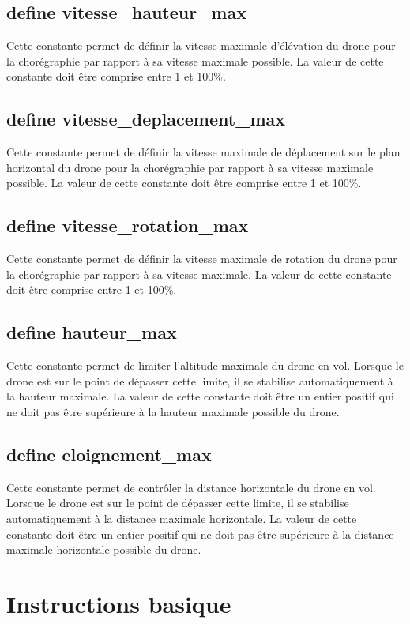 \documentclass[12pt, openany]{report}
\begin{document}
\subsection{define vitesse\_hauteur\_max}
Cette constante permet de définir la vitesse maximale d'élévation du drone pour la chorégraphie par rapport à sa vitesse maximale possible. \newline
La valeur de cette constante doit être comprise entre 1 et 100\%.
\subsection{define vitesse\_deplacement\_max}
Cette constante permet de définir la vitesse maximale de déplacement sur le plan horizontal du drone pour la chorégraphie par rapport à sa vitesse maximale possible. \newline
La valeur de cette constante doit être comprise entre 1 et 100\%.
\subsection{define vitesse\_rotation\_max}
Cette constante permet de définir la vitesse maximale de rotation du drone pour la chorégraphie par rapport à sa vitesse maximale. \newline
La valeur de cette constante doit être comprise entre 1 et 100\%.
\subsection{define hauteur\_max}
Cette constante permet de limiter l'altitude maximale du drone en vol. Lorsque le drone est sur le point de dépasser cette limite, il se stabilise automatiquement à la hauteur maximale. \newline
La valeur de cette constante doit être un entier positif qui ne doit pas être supérieure à la hauteur maximale possible du drone.
\subsection{define eloignement\_max}
Cette constante permet de contrôler la distance horizontale du drone en vol. Lorsque le drone est sur le point de dépasser cette limite, il se stabilise automatiquement à la distance maximale horizontale. \newline
La valeur de cette constante doit être un entier positif qui ne doit pas être supérieure à la distance maximale horizontale possible du drone.
\section{Instructions basique}
\end{document}
